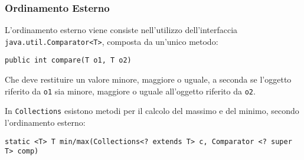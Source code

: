 \documentclass{article}
\numberwithin{equation}{subsection}
\begin{document}
\subsubsection{Ordinamento Esterno}

L'ordinamento esterno viene consiste nell'utilizzo dell'interfaccia \verb|java.util.Comparator<T>|, composta da un'unico metodo:
\begin{verbatim}
public int compare(T o1, T o2)
\end{verbatim}
Che deve restituire un valore minore, maggiore o uguale, a seconda se l'oggetto riferito da \verb|o1| sia minore, maggiore o uguale all'oggetto riferito da \verb|o2|. 

In \verb|Collections| esistono metodi per il calcolo del massimo e del minimo, secondo l'ordinamento esterno:
\begin{verbatim}
static <T> T min/max(Collections<? extends T> c, Comparator <? super T> comp)
\end{verbatim}
\end{document}
